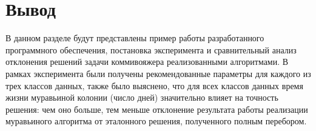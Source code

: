 \section{Вывод}

В данном разделе будут представлены пример работы разработанного программного обеспечения, постановка эксперимента и сравнительный анализ отклонения решений задачи коммивояжера реализованными алгоритмами.
 В рамках эксперимента были получены рекомендованные параметры для каждого из трех классов данных, также было выяснено, что для всех классов данных время жизни муравьиной колонии (число дней) значительно влияет на точность решения: чем оно больше, тем меньше отклонение результата работы реализации муравьиного алгоритма от эталонного решения, полученного полным перебором.
